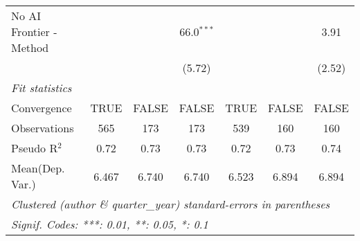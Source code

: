 \begin{tabular}{lcccccc}
   No AI Frontier - Method &              &               & 66.0$^{***}$  &         &               & 3.91\\   
                           &              &               & (5.72)        &         &               & (2.52)\\   
   \midrule
   \emph{Fit statistics}\\
   Convergence             &TRUE          & FALSE         & FALSE         & TRUE    & FALSE         & FALSE\\  
   Observations            & 565          & 173           & 173           & 539     & 160           & 160\\  
   Pseudo R$^2$            & 0.72         & 0.73          & 0.73          & 0.72    & 0.73          & 0.74\\  
Mean(Dep. Var.) & 6.467 & 6.740 & 6.740 & 6.523 & 6.894 & 6.894 \\
   \midrule \midrule
   \multicolumn{7}{l}{\emph{Clustered (author \& quarter\_year) standard-errors in parentheses}}\\
   \multicolumn{7}{l}{\emph{Signif. Codes: ***: 0.01, **: 0.05, *: 0.1}}\\
\end{tabular}
\par\endgroup

